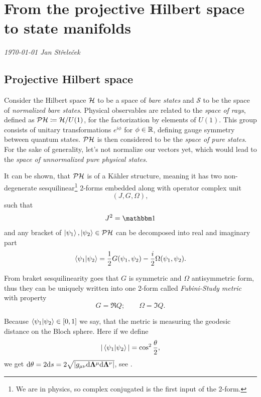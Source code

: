 \chapter{From the projective Hilbert space to state manifolds}
\textit{\today\newline
Jan Střeleček\newline}

\section{Projective Hilbert space}
Consider the Hilbert space $\mathcal{H}$ to be a space of \emph{bare states} and $\mathcal{S}$ to be the space of \emph{normalized bare states}. Physical observables are related to the \emph{space of rays}, defined as $\mathcal{PH}\coloneqq \mathcal{H}/U(1)$, for the factorization by elements of $U(1)$. This group consists of unitary transformations $e^{i\phi}$ for $\phi\in\mathbb{R}$, defining gauge symmetry between quantum states. $\mathcal{PH}$ is then considered to be the \emph{space of pure states}. For the sake of generality, let's not normalize our vectors yet, which would lead to the \emph{space of unnormalized pure physical states}. 

It can be shown, that $\mathcal{PH}$ is of a K\"ahler structure, meaning it has two non-degenerate sesquilinear\footnote{We are in physics, so complex conjugated is the first input of the 2-form.} 2-forms embedded along with operator complex unit
$$(J, G, \Omega),$$
such that
\begin{equation}
    J^2=\Id
\end{equation}
and any bracket of $\ket{\psi_1},\ket{\psi_2}\in \mathcal{PH}$ can be decomposed into real and imaginary part\citep{ashtekar_geometrical_1997}
\begin{equation}
    \braket{\psi_1|\psi_2}=\frac{1}{2}G(\psi_1,\psi_2)-\frac{i}{2}\Omega(\psi_1,\psi_2).
    \label{eq:quantumProd}
\end{equation}

From braket sesquilinearity goes that $G$ is symmetric and $\Omega$ antisymmetric form, thus they can be uniquely written into one 2-form called \emph{Fubini-Study metric} with property
\begin{equation}
    G=\Re Q ;\qquad \Omega=\Im Q.
\end{equation}

Because $\braket{\psi_1|\psi_2}\in[0,1]$ we say, that the metric is measuring the geodesic distance on the Bloch sphere. Here if we define
\begin{equation}
    |\braket{\psi_1|\psi_2}|=\cos^2 \frac{\theta}{2},
\end{equation}
we get $\mathrm{d} \theta= 2\mathrm{d} s=2\sqrt{|g_{\mu\nu}\mathrm{d} {\bm\Lambda}^\mu\mathrm{d} {\bm\Lambda}^\nu|}$, see \citet{cheng_quantum_2013}.

